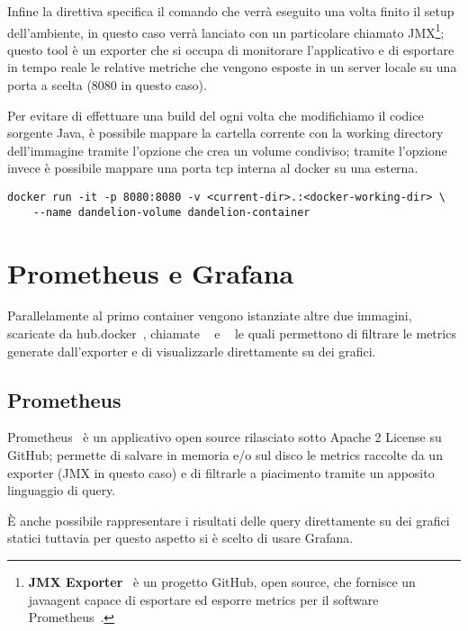 Infine la direttiva  specifica il comando che verrà eseguito una volta finito il setup dell'ambiente, in questo caso verrà lanciato  con un particolare
 chiamato JMX\footnote{
    \textbf{JMX Exporter}~\cite{jmx} è un progetto GitHub, open source, che fornisce un javaagent capace di esportare ed esporre metrics per il software 
    Prometheus~\cite{prometheus}.
};
questo tool è un exporter che si occupa di monitorare l'applicativo e di esportare in tempo reale le relative metriche che vengono esposte in un server locale su una porta a scelta 
(8080 in questo caso).

Per evitare di effettuare una build del  ogni volta che modifichiamo il codice sorgente Java, è possibile mappare la cartella corrente con la working directory 
dell'immagine tramite l'opzione  che crea un volume condiviso; tramite l'opzione  invece è possibile mappare una porta tcp interna al docker su una esterna.

\begin{lstlisting}[style=YmlStyle, caption=Run Docker]
    docker run -it -p 8080:8080 -v <current-dir>.:<docker-working-dir> \
    --name dandelion-volume dandelion-container
\end{lstlisting}

\section{Prometheus e Grafana}
Parallelamente al primo container vengono istanziate altre due immagini, scaricate da hub.docker~\cite{hub-docker}, chiamate ~\cite{docker-prometheus} 
e \code{grafana/grafana}~\cite{docker-grafana} le quali permettono di filtrare le metrics generate dall'exporter e di visualizzarle direttamente su dei grafici. 

\subsection{Prometheus}
Prometheus~\cite{prometheus} è un applicativo open source rilasciato sotto Apache 2 License su GitHub; permette di salvare in memoria e/o sul disco le metrics raccolte 
da un exporter (JMX in questo caso) e di filtrarle a piacimento tramite un apposito linguaggio di query. 

È anche possibile rappresentare i risultati delle query direttamente su dei grafici statici tuttavia per questo aspetto si è scelto di usare Grafana.

